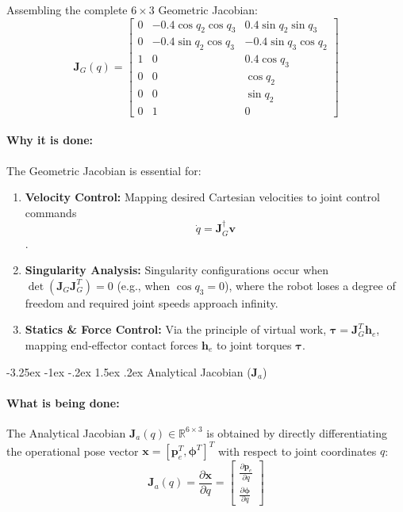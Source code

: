 \documentclass[11pt, a4paper]{article}
\makeatletter
\renewcommand{\subsection}{\@startsection{subsection}{2}{\z@}%
    {-3.25ex \@plus -1ex \@minus -.2ex}%
    {1.5ex \@plus .2ex}%
    {\normalfont\large\bfseries\color{brandaccent}}}
\makeatother
\begin{document}
Assembling the complete $6 \times 3$ Geometric Jacobian:
\begin{equation}
\mathbf{J}_G(q) = \begin{bmatrix}
0 & -0.4 \cos q_2 \cos q_3 & 0.4 \sin q_2 \sin q_3 \\
0 & -0.4 \sin q_2 \cos q_3 & -0.4 \sin q_3 \cos q_2 \\
1 & 0 & 0.4 \cos q_3 \\
0 & 0 & \cos q_2 \\
0 & 0 & \sin q_2 \\
0 & 1 & 0
\end{bmatrix}
\end{equation}

\paragraph{Why it is done:}
The Geometric Jacobian is essential for:
\begin{enumerate}[leftmargin=1.5em]
    \item \textbf{Velocity Control:} Mapping desired Cartesian velocities to joint control commands
\begin{equation}
    \dot{q} = \mathbf{J}_G^\dagger \mathbf{v}
\end{equation}.
    \item \textbf{Singularity Analysis:} Singularity configurations occur when $\det(\mathbf{J}_G \mathbf{J}_G^T) = 0$ (e.g., when $\cos q_3 = 0$), where the robot loses a degree of freedom and required joint speeds approach infinity.
    \item \textbf{Statics \& Force Control:} Via the principle of virtual work, $\boldsymbol{\tau} = \mathbf{J}_G^T \mathbf{h}_e$, mapping end-effector contact forces $\mathbf{h}_e$ to joint torques $\boldsymbol{\tau}$.
\end{enumerate}

\subsection{\texorpdfstring{Analytical Jacobian ($\mathbf{J}_a$)}{Analytical Jacobian (Ja)}}
\paragraph{What is being done:}
The Analytical Jacobian $\mathbf{J}_a(q) \in \mathbb{R}^{6 \times 3}$ is obtained by directly differentiating the operational pose vector $\mathbf{x} = [\mathbf{p}_e^T, \boldsymbol{\phi}^T]^T$ with respect to joint coordinates $q$:
\begin{equation}
    \mathbf{J}_a(q) = \frac{\partial \mathbf{x}}{\partial q} = \begin{bmatrix} \frac{\partial \mathbf{p}_e}{\partial q} \\[0.4em] \frac{\partial \boldsymbol{\phi}}{\partial q} \end{bmatrix}
\end{equation}
\end{document}
